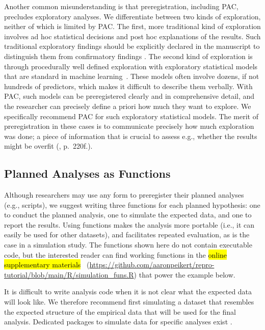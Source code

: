 \documentclass[psych,tutorial,accept,moreauthors,pdftex]{Definitions/mdpi}
\begin{document}
\begin{paracol}{2}
Another common misunderstanding is that preregistration, including PAC,
precludes exploratory analyses. We differentiate between two kinds of
exploration, neither of which is limited by PAC. The first, more
traditional kind of exploration involves ad hoc statistical decisions
and post hoc explanations of the results. Such traditional exploratory
findings should be explicitly declared in the manuscript to distinguish
them from confirmatory findings
\citep{NosekRevolution2018, nosekPreregistrationHardWorthwhile2019}. The
second kind of exploration is through procedurally well defined
exploration with exploratory statistical models that are standard in
machine learning~\citep{brandmaier22mlsem}. These models often involve
dozens, if not hundreds of predictors, which makes it difficult to
describe them verbally. With PAC, such models can be preregistered
clearly and in comprehensive detail, and the researcher can precisely define
a priori how much they want to explore. We specifically recommend PAC
for such exploratory statistical models. The merit of preregistration in
these cases is to communicate precisely how much exploration was done; a
piece of information that is crucial to assess e.g., whether the results
might be overfit
(\citep{hastieElementsStatisticalLearning2017}, p.~220f.).

\subsection{Planned Analyses as
Functions}\label{planned-analyses-as-functions}

Although researchers may use any form to preregister their planned
analyses (e.g., scripts), we suggest writing three functions for each
planned hypothesis: one to conduct the planned analysis, one to simulate
the expected data, and one to report the results. Using functions makes the
analysis more portable (i.e., it can easily be used for other datasets),
and facilitates repeated evaluation, as is the case in a simulation
study. The functions shown here do not contain executable code, but the
interested reader can find working functions in the \hl{online
supplementary materials}%
~(\url{https://github.com/aaronpeikert/repro-tutorial/blob/main/R/simulation_funs.R}) that power the example below.

It is difficult to write analysis code when it is not clear what the
expected data will look like. We therefore recommend first simulating a
dataset that resembles the expected structure of the empirical data that
will be used for the final analysis. Dedicated packages to simulate data
for specific analyses exist .


\end{paracol}
\end{document}
